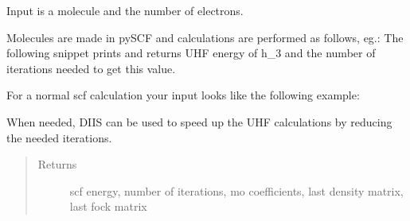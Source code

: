 \documentclass[letterpaper,10pt,english]{sphinxmanual}
\begin{document}
\begin{fulllineitems}
\label{\detokenize{UHF:ghf.UHF.UHF}}
Input is a molecule and the number of electrons.

Molecules are made in pySCF and calculations are performed as follows, eg.:
The following snippet prints and returns UHF energy of h\_3
and the number of iterations needed to get this value.

For a normal scf calculation your input looks like the following example:

\begin{sphinxVerbatim}[commandchars=\\\{\}]
          
   
\end{sphinxVerbatim}

\begin{fulllineitems}
\label{\detokenize{UHF:ghf.UHF.UHF.diis}}
When needed, DIIS can be used to speed up the UHF calculations by reducing the needed iterations.
\begin{quote}\begin{description}
\item[{Returns}] \leavevmode
scf energy, number of iterations, mo coefficients, last density matrix, last fock matrix

\end{description}\end{quote}


\end{fulllineitems}
\end{fulllineitems}
\end{document}
